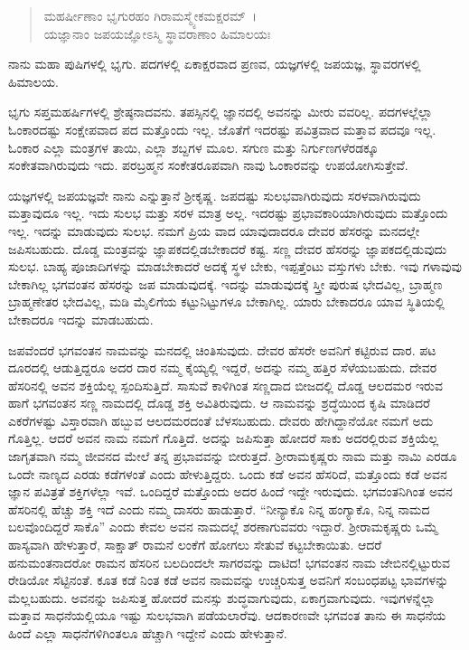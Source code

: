 \begin{verse}
ಮಹರ್ಷೀಣಾಂ ಭೃಗುರಹಂ ಗಿರಾಮಸ್ಮ್ಯೇಕಮಕ್ಷರಮ್~।\\ಯಜ್ಞಾನಾಂ ಜಪಯಜ್ಞೋಽಸ್ಮಿ ಸ್ಥಾವರಾಣಾಂ ಹಿಮಾಲಯಃ 
\end{verse}

{\small ನಾನು ಮಹಾ ಪುಷಿಗಳಲ್ಲಿ ಭೃಗು. ಪದಗಳಲ್ಲಿ ಏಕಾಕ್ಷರವಾದ ಪ್ರಣವ, ಯಜ್ಞಗಳಲ್ಲಿ ಜಪಯಜ್ಞ, ಸ್ಥಾವರಗಳಲ್ಲಿ ಹಿಮಾಲಯ.}

ಭೃಗು ಸಪ್ತಮಹರ್ಷಿಗಳಲ್ಲಿ ಶ್ರೇಷ್ಠನಾದವನು. ತಪಸ್ಸಿನಲ್ಲಿ ಜ್ಞಾನದಲ್ಲಿ ಅವನನ್ನು ಮೀರು ವವರಿಲ್ಲ. ಪದಗಳಲ್ಲೆಲ್ಲಾ ಓಂಕಾರದಷ್ಟು ಸಂಕ್ಷೇಪವಾದ ಪದ ಮತ್ತೊಂದು ಇಲ್ಲ. ಜೊತೆಗೆ ಇದರಷ್ಟು ಪವಿತ್ರವಾದ ಮತ್ತಾವ ಪದವೂ ಇಲ್ಲ. ಓಂಕಾರ ಎಲ್ಲಾ ಮಂತ್ರಗಳ ತಾಯಿ, ಎಲ್ಲಾ ಶಬ್ದಗಳ ಮೂಲ. ಸಗುಣ ಮತ್ತು ನಿರ್ಗುಣಗಳೆರಡಕ್ಕೂ ಸಂಕೇತವಾಗಿರುವುದು ಇದು. ಪರಬ್ರಹ್ಮನ ಸಂಕೇತರೂಪವಾಗಿ ನಾವು ಓಂಕಾರವನ್ನು ಉಪಯೋಗಿಸುತ್ತೇವೆ.

ಯಜ್ಞಗಳಲ್ಲಿ ಜಪಯಜ್ಞವೇ ನಾನು ಎನ್ನುತ್ತಾನೆ ಶ‍್ರೀಕೃಷ್ಣ. ಜಪದಷ್ಟು ಸುಲಭವಾಗಿರುವುದು ಸರಳವಾಗಿರುವುದು ಮತ್ತಾವುದೂ ಇಲ್ಲ. ಇದು ಸುಲಭ ಮತ್ತು ಸರಳ ಮಾತ್ರ ಅಲ್ಲ. ಇದರಷ್ಟು ಪ್ರಭಾವಕಾರಿಯಾಗಿರುವುದು ಮತ್ತೊಂದು ಇಲ್ಲ. ಇದನ್ನು ಮಾಡುವುದು ಸುಲಭ. ನಮಗೆ ಪ್ರಿಯ ವಾದ ಯಾವುದಾದರೂ ದೇವರ ಹೆಸರನ್ನು ಮನದಲ್ಲೇ ಜಪಿಸಬಹುದು. ದೊಡ್ಡ ಮಂತ್ರವನ್ನು ಜ್ಞಾಪಕದಲ್ಲಿಡಬೇಕಾದರೆ ಕಷ್ಟ. ಸಣ್ಣ ದೇವರ ಹೆಸರನ್ನು ಜ್ಞಾಪಕದಲ್ಲಿಡುವುದು ಸುಲಭ. ಬಾಹ್ಯ ಪೂಜಾದಿಗಳನ್ನು ಮಾಡಬೇಕಾದರೆ ಅದಕ್ಕೆ ಸ್ಥಳ ಬೇಕು, ಇಪ್ಪತ್ತೆಂಟು ವಸ್ತುಗಳು ಬೇಕು. ಇವು ಗಳಾವುವು ಬೇಕಾಗಿಲ್ಲ ಭಗವಂತನ ಹೆಸರನ್ನು ಜಪ ಮಾಡುವುದಕ್ಕೆ. ಇದನ್ನು ಮಾಡುವುದಕ್ಕೆ ಸ್ತ್ರೀ ಪುರುಷ ಭೇದವಿಲ್ಲ, ಬ್ರಾಹ್ಮಣ ಬ್ರಾಹ್ಮಣೇತರ ಭೇದವಿಲ್ಲ, ಮಡಿ ಮೈಲಿಗೆಯ ಕಟ್ಟುನಿಟ್ಟುಗಳೂ ಬೇಕಾಗಿಲ್ಲ. ಯಾರು ಬೇಕಾದರೂ ಯಾವ ಸ್ಥಿತಿಯಲ್ಲಿ ಬೇಕಾದರೂ ಇದನ್ನು ಮಾಡಬಹುದು.

ಜಪವೆಂದರೆ ಭಗವಂತನ ನಾಮವನ್ನು ಮನದಲ್ಲಿ ಚಿಂತಿಸುವುದು. ದೇವರ ಹೆಸರೇ ಅವನಿಗೆ ಕಟ್ಟಿರುವ ದಾರ. ಪಟ ದೂರದಲ್ಲಿ ಆಡುತ್ತಿದ್ದರೂ ಅದರ ದಾರ ನಮ್ಮ ಕೈಯ್ಯಲ್ಲಿ ಇದ್ದರೆ, ಅದನ್ನು ನಮ್ಮ ಹತ್ತಿರ ಸೆಳೆಯಬಹುದು. ದೇವರ ಹೆಸರಿನಲ್ಲಿ ಅವನ ಶಕ್ತಿಯೆಲ್ಲ ಸ್ಪಂದಿಸುತ್ತಿದೆ. ಸಾಸುವೆ ಕಾಳಿಗಿಂತ ಸಣ್ಣದಾದ ಬೀಜದಲ್ಲಿ ದೊಡ್ಡ ಆಲದಮರ ಇರುವ ಹಾಗೆ ಭಗವಂತನ ಸಣ್ಣ ನಾಮದಲ್ಲಿ ದೊಡ್ಡ ಶಕ್ತಿ ಅವಿತಿರುವುದು. ಆ ನಾಮವನ್ನು ಶ್ರದ್ಧೆಯಿಂದ ಕೃಷಿ ಮಾಡಿದರೆ ಎಕರೆಗಳಷ್ಟು ವಿಸ್ತಾರವಾಗಿ ಹಬ್ಬುವ ಆಲದಮರದಂತೆ ಬೆಳಸಬಹುದು. ದೇವರು ಹೇಗಿದ್ದಾನೆಯೋ ನಮಗೆ ಅದು ಗೊತ್ತಿಲ್ಲ. ಆದರೆ ಅವನ ನಾಮ ನಮಗೆ ಗೊತ್ತಿದೆ. ಅದನ್ನು ಜಪಿಸುತ್ತಾ ಹೋದರೆ ಸಾಕು ಅದರಲ್ಲಿರುವ ಶಕ್ತಿಯೆಲ್ಲ ಜಾಗೃತವಾಗಿ ನಮ್ಮ ಜೀವನದ ಮೇಲೆ ತನ್ನ ಪ್ರಭಾವವನ್ನು ಬೀರುತ್ತದೆ. ಶ‍್ರೀರಾಮಕೃಷ್ಣರು ನಾಮ ಮತ್ತು ನಾಮಿ ಎರಡೂ ಒಂದೇ ನಾಣ್ಯದ ಎರಡು ಕಡೆಗಳಂತೆ ಎಂದು ಹೇಳುತ್ತಿದ್ದರು. ಒಂದು ಕಡೆ ಅವನ ಹೆಸರಿದೆ, ಮತ್ತೊಂದು ಕಡೆ ಅವನ ಜ್ಞಾನ ಪವಿತ್ರತೆ ಶಕ್ತಿಗಳೆಲ್ಲಾ ಇವೆ. ಒಂದಿದ್ದರೆ ಮತ್ತೊಂದು ಅದರ ಹಿಂದೆ ಇದ್ದೇ ಇರುವುದು. ಭಗವಂತನಿಗಿಂತ ಅವನ ಹೆಸರಿನಲ್ಲಿ ಹೆಚ್ಚು ಶಕ್ತಿ ಇದೆ ಎಂದು ನಮ್ಮ ದಾಸರು ಹಾಡುತ್ತಾರೆ. “ನೀನ್ಯಾಕೊ ನಿನ್ನ ಹಂಗ್ಯಾಕೊ, ನಿನ್ನ ನಾಮದ ಬಲವೊಂದಿದ್ದರೆ ಸಾಕೊ” ಎಂದು ಕೇವಲ ಅವನ ನಾಮದಲ್ಲೆ ಶರಣಾಗುವವರು ಇದ್ದಾರೆ. ಶ‍್ರೀರಾಮಕೃಷ್ಣರು ಒಮ್ಮೆ ಹಾಸ್ಯವಾಗಿ ಹೇಳುತ್ತಾರೆ, ಸಾಕ್ಷಾತ್ ರಾಮನೆ ಲಂಕೆಗೆ ಹೋಗಲು ಸೇತುವೆ ಕಟ್ಟಬೇಕಾಯಿತು. ಆದರೆ ಹನುಮಂತನಾದರೋ ರಾಮನ ಹೆಸರಿನ ಬಲದಿಂದಲೇ ಸಾಗರವನ್ನು ದಾಟಿದ! ಭಗವಂತನ ನಾಮ ಜೇಬಿನಲ್ಲಿಟ್ಟುರುವ ರೇಡಿಯೋ ಸೆಟ್ಟಿನಂತೆ. ಕೂತ ಕಡೆ ನಿಂತ ಕಡೆ ಅವನ ನಾಮವನ್ನು ಉಚ್ಚರಿಸುತ್ತ ಅವನಿಗೆ ಸಂಬಂಧಪಟ್ಟ ಭಾವಗಳನ್ನು ಮೆಲ್ಲಬಹುದು. ಅವನನ್ನು ಜಪಿಸುತ್ತ ಹೋದರೆ ಮನಸ್ಸು ಶುದ್ಧವಾಗುವುದು, ಏಕಾಗ್ರವಾಗುವುದು. ಇವುಗಳನ್ನೆಲ್ಲಾ ಮತ್ತಾವ ಸಾಧನೆಯಲ್ಲಿಯೂ ಇಷ್ಟು ಸುಲಭವಾಗಿ ಪಡೆಯಲಾರೆವು. ಆದಕಾರಣವೇ ಭಗವಂತ ತಾನು ಈ ಸಾಧನೆಯ ಹಿಂದೆ ಎಲ್ಲಾ ಸಾಧನೆಗಳಿಗಿಂತಲೂ ಹೆಚ್ಚಾಗಿ ಇದ್ದೇನೆ ಎಂದು ಹೇಳುತ್ತಾನೆ.

